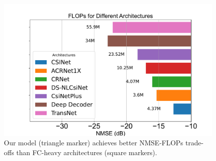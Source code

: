 \documentclass[lettersize,journal]{IEEEtran}
\begin{document}
\begin{figure}[t]
    \centering
    \includegraphics[width=\linewidth]{NMSEvsFLOPs.pdf}
    \caption{Our model (triangle marker) achieves better NMSE-FLOPs trade-offs than FC-heavy architectures (square markers).}
    \label{fig:efficiency-tradeoff}
\end{figure}
\end{document}
